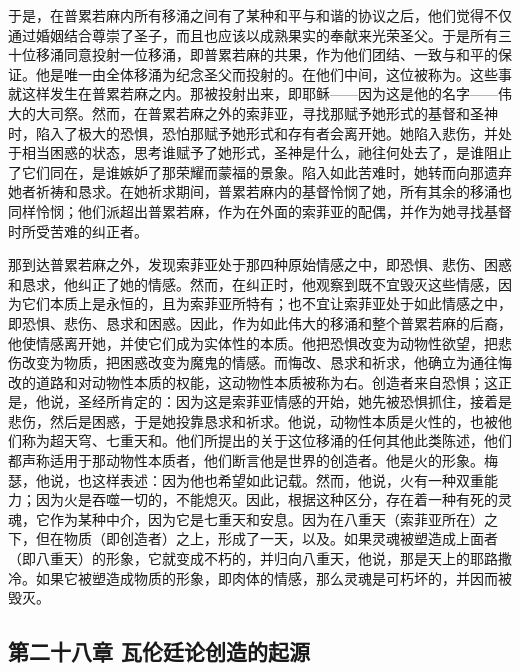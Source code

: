 于是，在普累若麻内所有移涌之间有了某种和平与和谐的协议之后，他们觉得不仅通过婚姻结合尊崇了圣子，而且也应该以成熟果实的奉献来光荣圣父。于是所有三十位移涌同意投射一位移涌，即普累若麻的共果，作为他们团结、一致与和平的保证。他是唯一由全体移涌为纪念圣父而投射的。在他们中间，这位被称为。这些事就这样发生在普累若麻之内。那被投射出来，即耶稣——因为这是他的名字——伟大的大司祭。然而，在普累若麻之外的索菲亚，寻找那赋予她形式的基督和圣神时，陷入了极大的恐惧，恐怕那赋予她形式和存有者会离开她。她陷入悲伤，并处于相当困惑的状态，思考谁赋予了她形式，圣神是什么，祂往何处去了，是谁阻止了它们同在，是谁嫉妒了那荣耀而蒙福的景象。陷入如此苦难时，她转而向那遗弃她者祈祷和恳求。在她祈求期间，普累若麻内的基督怜悯了她，所有其余的移涌也同样怜悯；他们派超出普累若麻，作为在外面的索菲亚的配偶，并作为她寻找基督时所受苦难的纠正者。\par

那到达普累若麻之外，发现索菲亚处于那四种原始情感之中，即恐惧、悲伤、困惑和恳求，他纠正了她的情感。然而，在纠正时，他观察到既不宜毁灭这些情感，因为它们本质上是永恒的，且为索菲亚所特有；也不宜让索菲亚处于如此情感之中，即恐惧、悲伤、恳求和困惑。因此，作为如此伟大的移涌和整个普累若麻的后裔，他使情感离开她，并使它们成为实体性的本质。他把恐惧改变为动物性欲望，把悲伤改变为物质，把困惑改变为魔鬼的情感。而悔改、恳求和祈求，他确立为通往悔改的道路和对动物性本质的权能，这动物性本质被称为右。创造者来自恐惧；这正是，他说，圣经所肯定的：因为这是索菲亚情感的开始，她先被恐惧抓住，接着是悲伤，然后是困惑，于是她投靠恳求和祈求。他说，动物性本质是火性的，也被他们称为超天穹、七重天和。他们所提出的关于这位移涌的任何其他此类陈述，他们都声称适用于那动物性本质者，他们断言他是世界的创造者。他是火的形象。梅瑟，他说，也这样表述：因为他也希望如此记载。然而，他说，火有一种双重能力；因为火是吞噬一切的，不能熄灭。因此，根据这种区分，存在着一种有死的灵魂，它作为某种中介，因为它是七重天和安息。因为在八重天（索菲亚所在）之下，但在物质（即创造者）之上，形成了一天，以及。如果灵魂被塑造成上面者（即八重天）的形象，它就变成不朽的，并归向八重天，他说，那是天上的耶路撒冷。如果它被塑造成物质的形象，即肉体的情感，那么灵魂是可朽坏的，并因而被毁灭。\par


\subsection{第二十八章 瓦伦廷论创造的起源}

